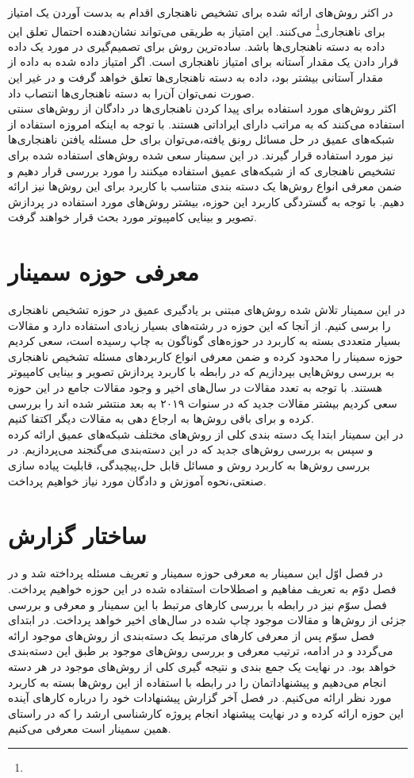 \documentclass[12pt,a4paper]{report}
\theoremstyle{definition}
\theoremstyle{theorem}
\theoremstyle{definition}
\begin{document}
در اکثر روش‌های ارائه شده برای تشخیص ناهنجاری اقدام به بدست آوردن یک امتیاز برای ناهنجاری\footnote{} می‌کنند. این امتیاز به طریقی می‌تواند نشان‌‌دهنده احتمال تعلق این داده به دسته ناهنجاری‌ها باشد. ساده‌ترین روش برای تصمیم‌گیری در مورد یک داده قرار دادن یک مقدار آستانه برای امتیاز ناهنجاری است. اگر امتیاز داده شده به داده از مقدار آستانی بیشتر بود، داده به دسته ناهنجاری‌ها تعلق خواهد گرفت و در غیر این صورت نمی‌توان آن‌را به دسته ناهنجاری‌ها انتصاب داد.\\

اکثر روش‌های مورد استفاده برای پیدا کردن ناهنجاری‌ها در دادگان از روش‌های سنتی استفاده می‌کنند که به مراتب دارای ایراداتی هستند. با توجه به اینکه امروزه استفاده از شبکه‌های عمیق در حل مسائل رونق یافته،‌می‌توان برای حل مسئله یافتن ناهنجاری‌‌ها نیز مورد استفاده قرار گیرند. در این سمینار سعی شده روش‌های استفاده شده برای تشخیص ناهنجاری که از شبکه‌های عمیق استفاده میکنند را مورد بررسی قرار دهیم و ضمن معرفی انواع روش‌ها یک دسته بندی متناسب با کاربرد برای این روش‌ها نیز ارائه دهیم. با توجه به گستردگی کاربرد این حوزه، بیشتر روش‌های مورد استفاده در پردازش تصویر و بینایی کامپیوتر مورد بحث قرار خواهند گرفت.
	\section{معرفی حوزه سمینار}
در این سمینار تلاش شده روش‌های مبتنی بر یادگیری عمیق در حوزه تشخیص ناهنجاری را برسی کنیم. از آنجا که این حوزه در رشته‌های بسیار زیادی استفاده دارد و مقالات بسیار متعددی بسته به کاربرد در حوزه‌های گوناگون به چاپ رسیده است، سعی کردیم حوزه سمینار را محدود کرده و ضمن معرفی انواع کاربرد‌های مسئله تشخیص ناهنجاری به بررسی روش‌هایی بپردازیم که در رابطه با کاربرد پردازش تصویر و بینایی کامپیوتر هستند. با توجه به تعدد مقالات در سال‌های اخیر و وجود مقالات جامع در این حوزه سعی کردیم بیشتر مقالات جدید که در سنوات ۲۰۱۹ به بعد منتشر شده اند را بررسی کرده و برای باقی روش‌ها به ارجاع دهی به مقالات دیگر اکتفا کنیم.\\

در این سمینار ابتدا یک دسته بندی کلی از روش‌های مختلف شبکه‌های عمیق ارائه کرده و سپس به بررسی روش‌های جدید که در این دسته‌بندی می‌گنجند می‌پردازیم.
در بررسی روش‌ها به کاربرد روش و مسائل قابل حل،‌پیچیدگی، قابلیت پیاده سازی صنعتی،‌نحوه آموزش و دادگان مورد نیاز خواهیم پرداخت.
	\section{ساختار گزارش}
در فصل اوّل این سمینار به معرفی حوزه سمینار و تعریف مسئله پرداخته شد و در فصل دوّم به تعریف مفاهیم و اصطلاحات استفاده شده در این حوزه خواهیم پرداخت. فصل سوّم نیز در رابطه با بررسی کار‌های مرتبط با این سمینار و معرفی و بررسی جزئی از روش‌ها و مقالات موجود چاپ شده در سال‌های اخیر خواهد پرداخت. در ابتدای فصل سوّم پس از معرفی کار‌های مرتبط یک دسته‌بندی از روش‌های موجود ارائه می‌گردد و در ادامه، ترتیب معرفی و بررسی روش‌های موجود بر طبق این دسته‌بندی خواهد بود. در نهایت یک جمع بندی و نتیجه گیری کلی از روش‌های موجود در هر دسته انجام می‌دهیم و پیشنهاداتمان را در رابطه با استفاده از این روش‌ها بسته به کاربرد مورد نظر ارائه می‌کنیم. در فصل آخر گزارش پیشنهادات خود را درباره کار‌های آینده این حوزه ارائه کرده و در نهایت پیشنهاد انجام پروژه کارشناسی ارشد را که در راستای همین سمینار است معرفی می‌کنیم.
\end{document}
